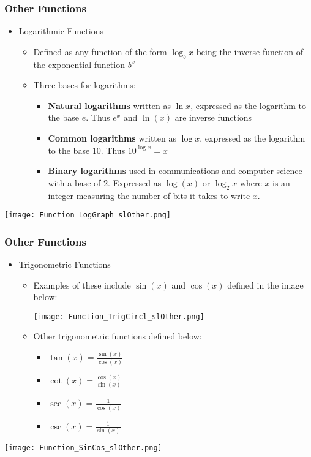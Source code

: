 \documentclass{beamer}
\begin{document}
\begin{frame}[fragile]\frametitle{Other Functions}

\begin{itemize}
  \item Logarithmic Functions
  \begin{itemize}
    \item Defined as any function of the form $\log_bx$ being the inverse function of the exponential function $b^x$
    \item Three bases for logarithms:
    \begin{itemize}
      \item \textbf{Natural logarithms} written as $\ln x$, expressed as the logarithm to the base $e$. Thus $e^x$ and $\ln(x)$ are inverse functions
      \item \textbf{Common logarithms} written as $\log x$, expressed as the logarithm to the base $10$. Thus $10^{\log x} = x$
      \item \textbf{Binary logarithms} used in communications and computer science with a base of $2$. Expressed as $\log(x)$ or $\log_2x$ where $x$ is an integer measuring the number of bits it takes to write $x$.
    \end{itemize}
  \end{itemize}
\end{itemize}
\begin{center}\texttt{[image: Function\_LogGraph\_slOther.png]} \end{center}

\end{frame}

\begin{frame}[fragile]\frametitle{Other Functions}

\begin{itemize}
  \item Trigonometric Functions
  \begin{itemize}
    \item Examples of these include $\sin(x)$ and $\cos(x)$ defined in the image below:
      \begin{center}\texttt{[image: Function\_TrigCircl\_slOther.png]} \end{center}
    \item Other trigonometric functions defined below:
    \begin{itemize}
      \item $\tan(x) = \frac{\sin(x)}{\cos(x)}$
      \item $\cot(x) = \frac{\cos(x)}{\sin(x)}$
      \item $\sec(x) = \frac{1}{\cos(x)}$
      \item $\csc(x) = \frac{1}{\sin(x)}$
    \end{itemize}
  \end{itemize}
\end{itemize}
\begin{center}\texttt{[image: Function\_SinCos\_slOther.png]} \end{center}

\end{frame}
\end{document}

